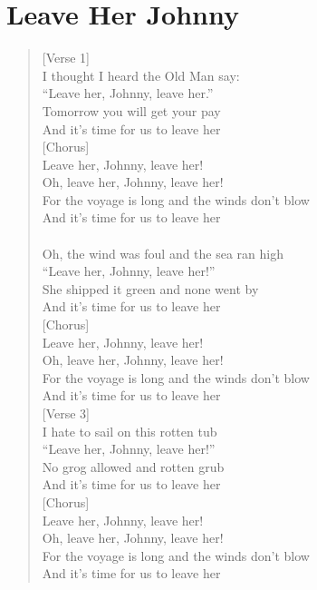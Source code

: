 \documentclass[11pt]{article}
\begin{document}
\section{Leave Her Johnny}
\label{sec:orgfb35379}
\begin{verse}
[Verse 1]\\
I thought I heard the Old Man say:\\
``Leave her, Johnny, leave her.''\\
Tomorrow you will get your pay\\
And it's time for us to leave her\\
\vspace*{1em}
[Chorus]\\
Leave her, Johnny, leave her!\\
Oh, leave her, Johnny, leave her!\\
For the voyage is long and the winds don't blow\\
And it's time for us to leave her\\
[Verse 2]\\
Oh, the wind was foul and the sea ran high\\
``Leave her, Johnny, leave her!''\\
She shipped it green and none went by\\
And it's time for us to leave her\\
\vspace*{1em}
[Chorus]\\
Leave her, Johnny, leave her!\\
Oh, leave her, Johnny, leave her!\\
For the voyage is long and the winds don't blow\\
And it's time for us to leave her\\
\vspace*{1em}
[Verse 3]\\
I hate to sail on this rotten tub\\
``Leave her, Johnny, leave her!''\\
No grog allowed and rotten grub\\
And it's time for us to leave her\\
\vspace*{1em}
[Chorus]\\
Leave her, Johnny, leave her!\\
Oh, leave her, Johnny, leave her!\\
For the voyage is long and the winds don't blow\\
And it's time for us to leave her\\

\end{verse}
\end{document}
